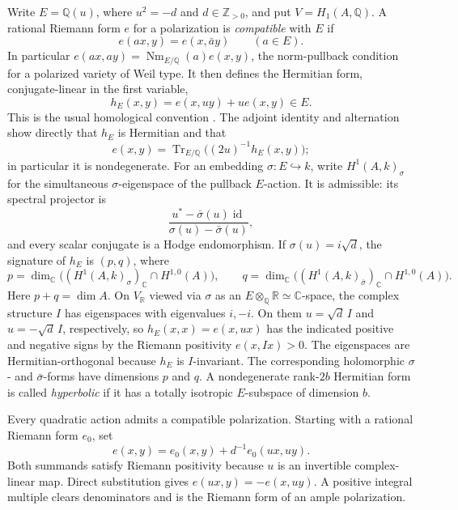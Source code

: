 \documentclass[11pt]{article}
\newcommand{\Q}{\mathbb Q}
\newcommand{\C}{\mathbb C}
\numberwithin{equation}{section}
\begin{document}
Write \(E=\Q(u)\), where \(u^2=-d\) and \(d\in\mathbb Z_{>0}\), and put
\(V=H_1(A,\Q)\).  A rational Riemann form \(e\) for a polarization
is \emph{compatible} with \(E\) if
\[
 e(ax,y)=e(x,\bar a y)\qquad(a\in E).
\]
In particular \(e(ax,ay)=\operatorname{Nm}_{E/\Q}(a)e(x,y)\),
the norm-pullback condition for a polarized variety of Weil type.
It then defines the Hermitian form, conjugate-linear in the first
variable,
\begin{equation}
 \label{p3ab:eq:hermitian}
 h_E(x,y)=e(x,uy)+u e(x,y)\in E.
\end{equation}
This is the usual homological convention
\cite[Lemma~5.2]{vanGeemenWeilNotes}.  The adjoint identity and
alternation show directly that \(h_E\) is Hermitian and that
\[
 e(x,y)=\operatorname{Tr}_{E/\Q}\bigl((2u)^{-1}h_E(x,y)\bigr);
\]
in particular it is nondegenerate.  For an embedding
\(\sigma:E\hookrightarrow k\), write \(H^1(A,k)_\sigma\) for
the simultaneous \(\sigma\)-eigenspace of the pullback \(E\)-action.
It is admissible: its spectral projector is
\[
 \frac{u^*-\bar\sigma(u)\operatorname{id}}
      {\sigma(u)-\bar\sigma(u)},
\]
and every scalar conjugate is a Hodge endomorphism.
If \(\sigma(u)=i\sqrt d\), the signature of \(h_E\) is \((p,q)\), where
\[
 p=\dim_\C\bigl((H^1(A,k)_\sigma)_\C\cap H^{1,0}(A)\bigr),
 \qquad
 q=\dim_\C\bigl((H^1(A,k)_{\bar\sigma})_\C\cap H^{1,0}(A)\bigr).
\]
Here \(p+q=\dim A\).  On \(V_{\mathbb R}\) viewed via \(\sigma\)
as an \(E\otimes_\Q\mathbb R\simeq\C\)-space, the
complex structure \(I\) has eigenspaces with eigenvalues \(i,-i\).
On them \(u=\sqrt d\,I\) and \(u=-\sqrt d\,I\), respectively, so
\(h_E(x,x)=e(x,ux)\) has the indicated positive and negative signs
by the Riemann positivity \(e(x,Ix)>0\).  The eigenspaces are
Hermitian-orthogonal because \(h_E\) is \(I\)-invariant.  The corresponding
holomorphic \(\sigma\)- and \(\bar\sigma\)-forms have dimensions
\(p\) and \(q\).  A nondegenerate rank-\(2b\) Hermitian form is called
\emph{hyperbolic} if it has a totally isotropic \(E\)-subspace of
dimension \(b\).

Every quadratic action admits a compatible polarization.  Starting
with a rational Riemann form \(e_0\), set
\begin{equation}
 \label{p3ab:eq:averaging}
 e(x,y)=e_0(x,y)+d^{-1}e_0(ux,uy).
\end{equation}
Both summands satisfy Riemann positivity because \(u\) is an invertible
complex-linear map.  Direct substitution gives
\(e(ux,y)=-e(x,uy)\).  A positive integral multiple clears
denominators and is the Riemann form of an ample polarization.
\end{document}

